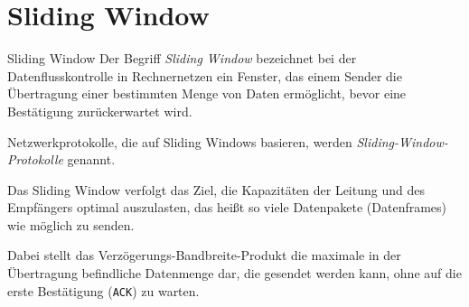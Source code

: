 \section{Sliding Window}

\begin{defi}{Sliding Window}
    Der Begriff \emph{Sliding Window} bezeichnet bei der Datenflusskontrolle in Rechnernetzen ein Fenster, das einem Sender die Übertragung einer bestimmten Menge von Daten ermöglicht, bevor eine Bestätigung zurückerwartet wird.

    Netzwerkprotokolle, die auf Sliding Windows basieren, werden \emph{Sliding-Window-Protokolle} genannt.

    Das Sliding Window verfolgt das Ziel, die Kapazitäten der Leitung und des Empfängers optimal auszulasten, das heißt so viele Datenpakete (Datenframes) wie möglich zu senden.

    Dabei stellt das Verzögerungs-Bandbreite-Produkt die maximale in der Übertragung befindliche Datenmenge dar, die gesendet werden kann, ohne auf die erste Bestätigung (\texttt{ACK}) zu warten.
\end{defi}